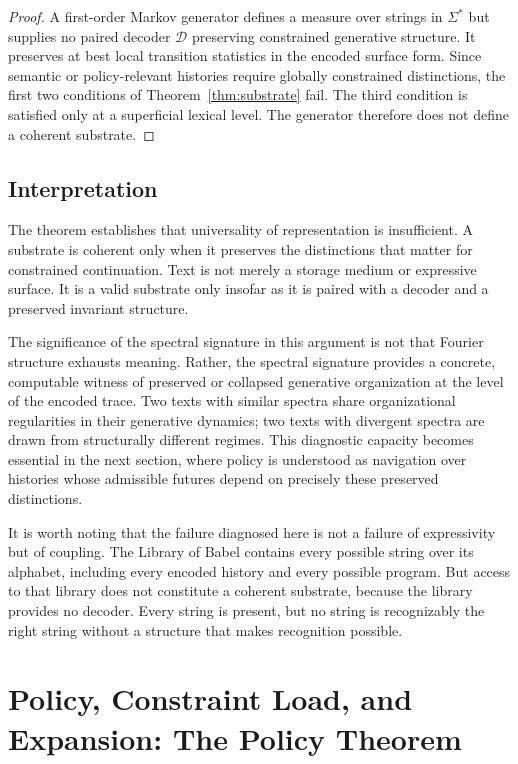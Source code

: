 \documentclass[12pt, a4paper]{article}
\theoremstyle{plain}
\theoremstyle{definition}
\theoremstyle{remark}
\begin{document}
\begin{proof}
A first-order Markov generator defines a measure over strings in $\Sigma^*$ but supplies no paired decoder $\mathcal{D}$ preserving constrained generative structure. It preserves at best local transition statistics in the encoded surface form. Since semantic or policy-relevant histories require globally constrained distinctions, the first two conditions of Theorem~\ref{thm:substrate} fail. The third condition is satisfied only at a superficial lexical level. The generator therefore does not define a coherent substrate.
\end{proof}

\subsection{Interpretation}

The theorem establishes that universality of representation is insufficient. A substrate is coherent only when it preserves the distinctions that matter for constrained continuation. Text is not merely a storage medium or expressive surface. It is a valid substrate only insofar as it is paired with a decoder and a preserved invariant structure.

The significance of the spectral signature in this argument is not that Fourier structure exhausts meaning. Rather, the spectral signature provides a concrete, computable witness of preserved or collapsed generative organization at the level of the encoded trace. Two texts with similar spectra share organizational regularities in their generative dynamics; two texts with divergent spectra are drawn from structurally different regimes. This diagnostic capacity becomes essential in the next section, where policy is understood as navigation over histories whose admissible futures depend on precisely these preserved distinctions.

It is worth noting that the failure diagnosed here is not a failure of expressivity but of coupling. The Library of Babel contains every possible string over its alphabet, including every encoded history and every possible program. But access to that library does not constitute a coherent substrate, because the library provides no decoder. Every string is present, but no string is recognizably the right string without a structure that makes recognition possible.

\section{Policy, Constraint Load, and Expansion: The Policy Theorem}
\end{document}
